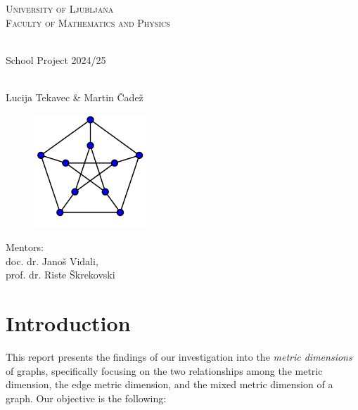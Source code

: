 \documentclass[12pt]{amsart}
\theoremstyle{plain}
\begin{document}
\begin{titlepage}
  \centering
  \Large \textsc{University of Ljubljana} \\[0.3cm]
  \textsc{\large Faculty of Mathematics and Physics}\\[2.5cm]

  \vspace{2.5cm}

  \\[0.3cm]
  \large School Project 2024/25 \\[1.8cm]
  \\[0.5cm]

  \vspace{0.3cm}

  \Large{Lucija Tekavec \& Martin Čadež} \\[0.2cm]

  \vspace{1.2cm}

  \begin{figure}[h!]
    \includegraphics[width=0.38\textwidth, height=0.28\textheight]{../figures/petersen_graph.png}
    \label{fig:petersen_graph}
  \end{figure}
  \vspace{0.3cm}

  \large{Mentors: \\ doc. dr. Janoš Vidali, \\ prof. dr. Riste Škrekovski} \\[0.2cm]
  \vfill

\end{titlepage}

\newpage

\section{\huge Introduction}
This report presents the findings of our investigation into the \textit{metric dimensions} of graphs, specifically focusing on the two relationships among the metric dimension, the edge metric dimension, and the mixed metric dimension of a graph. Our objective is the following:
\end{document}
